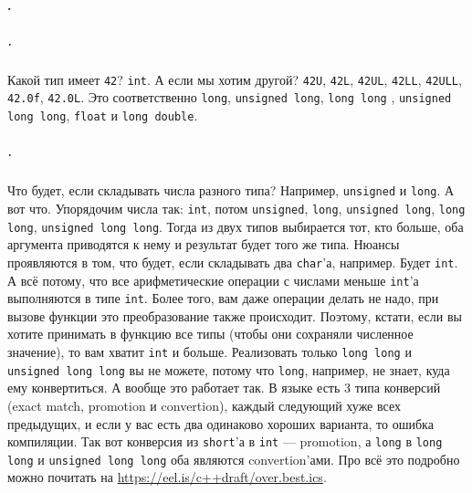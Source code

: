 \documentclass{article}
\begin{document}
    \paragraph{.}
    \subparagraph{.}
    Какой тип имеет \texttt{42}? \texttt{int}. А если мы хотим другой? \texttt{42U}, \texttt{42L}, \texttt{42UL}, \texttt{42LL}, \texttt{42ULL}, \texttt{42.0f}, \texttt{42.0L}. Это соответственно \texttt{long}, \texttt{unsigned long}, \texttt{long long} , \texttt{unsigned long long}, \texttt{float} и \texttt{long double}.
    \subparagraph{.}
    Что будет, если складывать числа разного типа? Например, \texttt{unsigned} и \texttt{long}. А вот что. Упорядочим числа так: \texttt{int}, потом \texttt{unsigned}, \texttt{long}, \texttt{unsigned long}, \texttt{long long}, \texttt{unsigned long long}. Тогда из двух типов выбирается тот, кто больше, оба аргумента приводятся к нему и результат будет того же типа. Нюансы проявляются в том, что будет, если складывать два \texttt{char}'а, например. Будет \texttt{int}. А всё потому, что все арифметические операции с числами меньше \texttt{int}'а выполняются в типе \texttt{int}. Более того, вам даже операции делать не надо, при вызове функции это преобразование также происходит. Поэтому, кстати, если вы хотите принимать в функцию все типы (чтобы они сохраняли численное значение), то вам хватит \texttt{int} и больше. Реализовать только \texttt{long long} и \texttt{unsigned long long} вы не можете, потому что \texttt{long}, например, не знает, куда ему конвертиться. А вообще это работает так. В языке есть 3 типа конверсий (exact match, promotion и convertion), каждый следующий хуже всех предыдущих, и если у вас есть два одинаково хороших варианта, то ошибка компиляции. Так вот конверсия из \texttt{short}'а в \texttt{int} --- promotion, а \texttt{long} в \texttt{long long} и \texttt{unsigned long long} оба являются convertion'ами. Про всё это подробно можно почитать на \url{https://eel.is/c++draft/over.best.ics}.
\end{document}
